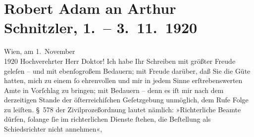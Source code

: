 

         \renewcommand{\erwaehnteInstitutionen}{Institutionen: Deutschösterreichischer Autorenverband, Vereinigung der österreichischen Richterinnen und Richter}
         \renewcommand{\erwaehnteOrte}{Orte: Wien}
         \renewcommand{\erwaehnteWerke}{}
               \section[Robert Adam an Arthur Schnitzler, 1. – 3. 11. 1920]{ Robert Adam an Arthur Schnitzler, 1. – 3. 11. 1920}\nopagebreak{}\rehead{ }\begin{ledgroupsized}[t]{13cm}\normalsize\beginnumbering \toendnotes[C]{\smallbreak\pagebreak[2]} 
\toendnotes[C]{\smallbreak}\pstart
           \raggedleft{}{\pb}Wien, am 1. November{\\}1920\pend
           \pstart\center{}Hochverehrter Herr Doktor!\pend\pstart
           Ich habe Ihr Schreiben mit größter Freude geleſen – und mit ebenſogroßem
                    Bedauern; mit Freude darüber, daß Sie die Güte hatten, mich zu einem ſo
                    ehrenvollen und mir in jedem Sinne erſtrebenswerten Amte in Vorſchlag zu
                    bringen; mit Bedauern – denn es iſt mir nach dem derzeitigen Stande der
                    öſterreichiſchen Geſetzgebung unmöglich, dem Rufe Folge zu leiſten. § 578 der
                    Zivilprozeßordnung lautet nämlich: »Richterliche Beamte dürfen, ſolange ſie im
                    richterlichen Dienste ſtehen, die Beſtellung als Schiedsrichter nicht annehmen«,

\end{ledgroupsized}
